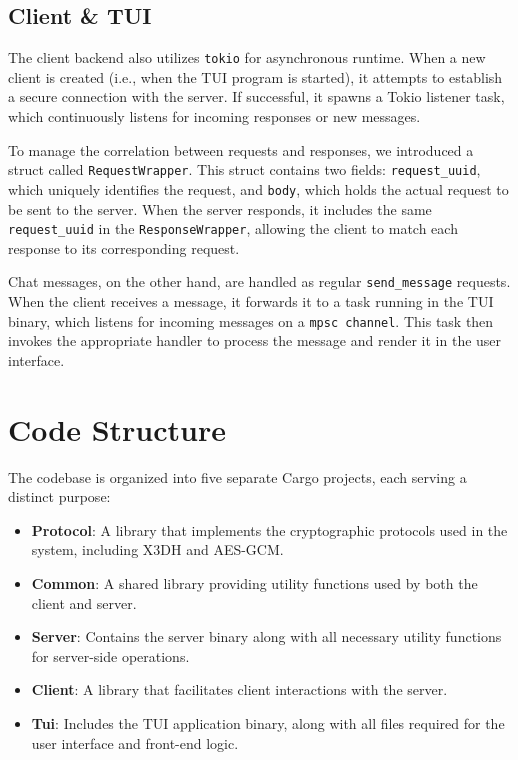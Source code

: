 \subsection{Client \& TUI}
\label{subsec:ClientTUI}

The client backend also utilizes \texttt{tokio} for asynchronous runtime. When a new client is created (i.e., when the TUI program is started), it attempts to establish a secure connection with the server. If successful, it spawns a Tokio listener task, which continuously listens for incoming responses or new messages.  

To manage the correlation between requests and responses, we introduced a struct called \texttt{RequestWrapper}. This struct contains two fields: \texttt{request\_uuid}, which uniquely identifies the request, and \texttt{body}, which holds the actual request to be sent to the server. When the server responds, it includes the same \texttt{request\_uuid} in the \texttt{ResponseWrapper}, allowing the client to match each response to its corresponding request.  

Chat messages, on the other hand, are handled as regular \texttt{send\_message} requests. When the client receives a message, it forwards it to a task running in the TUI binary, which listens for incoming messages on a \texttt{mpsc channel}. This task then invokes the appropriate handler to process the message and render it in the user interface.
\newpage
\section{Code Structure}
\label{sec:CodeStructure}


The codebase is organized into five separate Cargo projects, each serving a distinct purpose:

\begin{itemize}
    \item \textbf{Protocol}: A library that implements the cryptographic protocols used in the system, including X3DH and AES-GCM.
    \item \textbf{Common}: A shared library providing utility functions used by both the client and server.
    \item \textbf{Server}: Contains the server binary along with all necessary utility functions for server-side operations.
    \item \textbf{Client}: A library that facilitates client interactions with the server.
    \item \textbf{Tui}: Includes the TUI application binary, along with all files required for the user interface and front-end logic.
\end{itemize}

